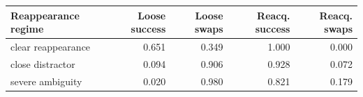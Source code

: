 \begin{tabular}{lrrrr}
\toprule
Reappearance regime & Loose success & Loose swaps & Reacq. success & Reacq. swaps \\
\midrule
clear reappearance & 0.651 & 0.349 & 1.000 & 0.000 \\
close distractor & 0.094 & 0.906 & 0.928 & 0.072 \\
severe ambiguity & 0.020 & 0.980 & 0.821 & 0.179 \\
\bottomrule
\end{tabular}
